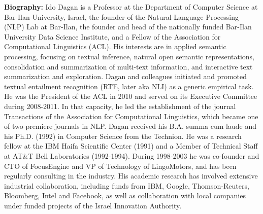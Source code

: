 {\bfseries Biography:} Ido Dagan is a Professor at the Department of Computer Science at Bar-Ilan University, Israel, the founder of the Natural Language Processing (NLP) Lab at Bar-Ilan, the founder and head of the nationally funded Bar-Ilan University Data Science Institute, and a Fellow of the Association for Computational Linguistics (ACL). His interests are in applied semantic processing, focusing on textual inference, natural open semantic representations, consolidation and summarization of multi-text information, and interactive text summarization and exploration. Dagan and colleagues
 initiated and promoted textual entailment recognition (RTE, later aka NLI) as a generic empirical task. He was the President of the ACL in 2010 and served on its Executive Committee during 2008-2011. In that capacity, he led the establishment of the journal Transactions of the Association for Computational Linguistics, which became one of two premiere journals in NLP. Dagan received his B.A. summa cum laude and his Ph.D. (1992) in Computer Science from the Technion. He was a research fellow at the IBM Haifa Scientific Center (1991) and a Member of Technical Staff at AT&T Bell Laboratories (1992-1994). During 1998-2003 he was co-founder and CTO of FocusEngine and VP of Technology of LingoMotors, and has been regularly consulting in the industry. His academic research has involved extensive industrial collaboration, including funds from IBM, Google, Thomson-Reuters, Bloomberg, Intel and Facebook, as well as collaboration with local companies under funded projects of the Israel Innovation Authority.

\newpage
